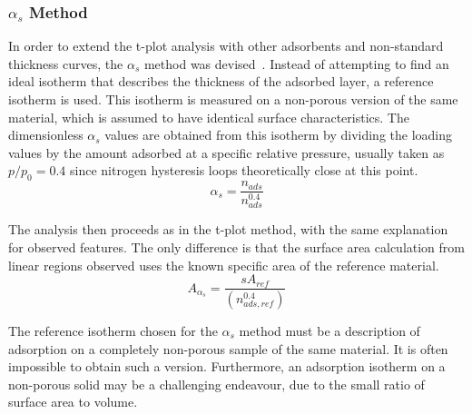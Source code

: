 \subsubsection{\(\alpha_s\) Method}\label{pyg:charac:alphasplot}

In order to extend the t-plot analysis with other adsorbents and
non-standard thickness curves, the \(\alpha_s\) method was
devised~\cite{atkinsonAdsorptivePropertiesMicroporous1984}.
Instead of attempting to find an ideal isotherm that describes the
thickness of the adsorbed layer, a reference isotherm is used.
This isotherm is measured on a non-porous version of the same material,
which is assumed to have identical surface characteristics.
The dimensionless \(\alpha_s\) values are obtained from this isotherm by
dividing the loading values by the amount adsorbed at a specific relative
pressure, usually taken as \(p/p_0=0.4\) since nitrogen hysteresis loops
theoretically close at this point.
%
\begin{equation}
	\alpha_s = \frac{n_{ads}}{n_{ads}^{0.4}}
\end{equation}

The analysis then proceeds as in the t-plot method, with the
same explanation for observed features. The only difference is
that the surface area calculation from linear regions observed
uses the known specific area of the reference material.
%
\begin{equation}
	A_{\alpha_s} = \frac{s A_{ref}}{{(n_{ads, ref}^{0.4})}}
\end{equation}

The reference isotherm chosen for the \(\alpha_s\) method must
be a description of adsorption on a completely non-porous sample
of the same material. It is often impossible to obtain such
a version. Furthermore, an adsorption isotherm on a non-porous
solid may be a challenging endeavour, due to the small ratio
of surface area to volume.